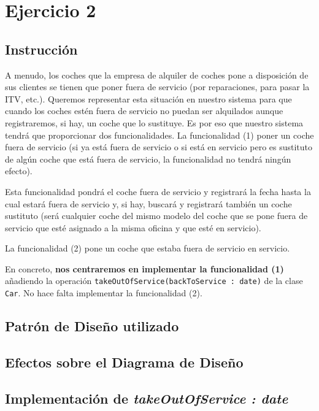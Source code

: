\section{Ejercicio 2}
\subsection*{Instrucción}
A menudo, los coches que la empresa de alquiler de coches pone a disposición de sus clientes se tienen que poner
fuera de servicio (por reparaciones, para pasar la ITV, etc.). Queremos representar esta situación en nuestro sistema
para que cuando los coches estén fuera de servicio no puedan ser alquilados aunque registraremos, si hay, un coche
que lo sustituye. Es por eso que nuestro sistema tendrá que proporcionar dos funcionalidades. La funcionalidad (1) poner 
un coche fuera de servicio (si ya está fuera de servicio o si está en servicio pero es sustituto de algún coche
que está fuera de servicio, la funcionalidad no tendrá ningún efecto).\par
\vspace{0.15cm}
Esta funcionalidad pondrá el coche fuera de servicio y registrará la fecha hasta la cual estará fuera de servicio y, si hay, buscará y registrará también un coche
sustituto (será cualquier coche del mismo modelo del coche que se pone fuera de servicio que esté asignado a la
misma oficina y que esté en servicio).\par
\vspace{0.15cm}
La funcionalidad (2) pone un coche que estaba fuera de servicio en servicio.\par
\vspace{0.15cm}
En concreto, \textbf{nos centraremos en implementar la funcionalidad (1)} añadiendo la operación
\texttt{takeOutOfService(backToService : date)} de la clase \texttt{Car}. No hace falta implementar la funcionalidad (2).

\subsection{Patrón de Diseño utilizado}


\subsection{Efectos sobre el Diagrama de Diseño}

\subsection{Implementación de \textit{takeOutOfService : date}}

\newpage
